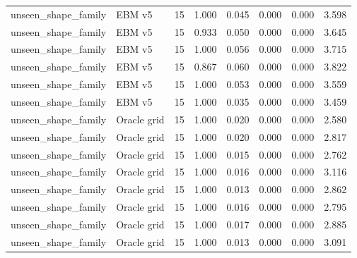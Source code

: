{\begin{longtable}{llrrrrrr}
unseen\_shape\_family & EBM v5 & 15 & 1.000 & 0.045 & 0.000 & 0.000 & 3.598 \\
unseen\_shape\_family & EBM v5 & 15 & 0.933 & 0.050 & 0.000 & 0.000 & 3.645 \\
unseen\_shape\_family & EBM v5 & 15 & 1.000 & 0.056 & 0.000 & 0.000 & 3.715 \\
unseen\_shape\_family & EBM v5 & 15 & 0.867 & 0.060 & 0.000 & 0.000 & 3.822 \\
unseen\_shape\_family & EBM v5 & 15 & 1.000 & 0.053 & 0.000 & 0.000 & 3.559 \\
unseen\_shape\_family & EBM v5 & 15 & 1.000 & 0.035 & 0.000 & 0.000 & 3.459 \\
unseen\_shape\_family & Oracle grid & 15 & 1.000 & 0.020 & 0.000 & 0.000 & 2.580 \\
unseen\_shape\_family & Oracle grid & 15 & 1.000 & 0.020 & 0.000 & 0.000 & 2.817 \\
unseen\_shape\_family & Oracle grid & 15 & 1.000 & 0.015 & 0.000 & 0.000 & 2.762 \\
unseen\_shape\_family & Oracle grid & 15 & 1.000 & 0.016 & 0.000 & 0.000 & 3.116 \\
unseen\_shape\_family & Oracle grid & 15 & 1.000 & 0.013 & 0.000 & 0.000 & 2.862 \\
unseen\_shape\_family & Oracle grid & 15 & 1.000 & 0.016 & 0.000 & 0.000 & 2.795 \\
unseen\_shape\_family & Oracle grid & 15 & 1.000 & 0.017 & 0.000 & 0.000 & 2.885 \\
unseen\_shape\_family & Oracle grid & 15 & 1.000 & 0.013 & 0.000 & 0.000 & 3.091 \\
\bottomrule
\end{longtable}
}
